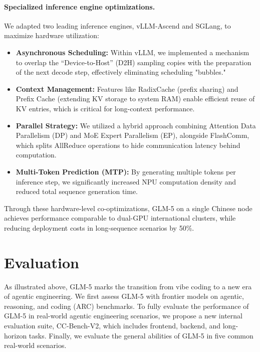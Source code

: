 \documentclass{article}
\theoremstyle{definition}
\begin{document}
\paragraph{Specialized inference engine optimizations.}
We adapted two leading inference engines, vLLM-Ascend and SGLang, to maximize hardware utilization:

\begin{itemize}[leftmargin=1.5em,itemsep=2pt]
    \item \textbf{Asynchronous Scheduling:} Within vLLM, we implemented a mechanism to overlap the ``Device-to-Host'' (D2H) sampling copies with the preparation of the next decode step, effectively eliminating scheduling "bubbles."
    
    \item \textbf{Context Management:} Features like RadixCache (prefix sharing) and Prefix Cache (extending KV storage to system RAM) enable efficient reuse of KV entries, which is critical for long-context performance.

    \item \textbf{Parallel Strategy:} We utilized a hybrid approach combining Attention Data Parallelism (DP) and MoE Expert Parallelism (EP), alongside FlashComm, which splits AllReduce operations to hide communication latency behind computation.

    \item \textbf{Multi-Token Prediction (MTP):} By generating multiple tokens per inference step, we significantly increased NPU computation density and reduced total sequence generation time.
\end{itemize}

Through these hardware-level co-optimizations, GLM-5 on a single Chinese node achieves performance comparable to dual-GPU international clusters, while reducing deployment costs in long-sequence scenarios by 50\%.

\section{Evaluation}
\label{sec:evaluation}

As illustrated above, GLM-5 marks the transition from vibe coding to a new era of agentic engineering. 
We first assess GLM-5 with frontier models on agentic, reasoning, and coding (ARC) benchmarks. 
To fully evaluate the performance of GLM-5 in real-world agentic engineering scenarios, we propose a new internal evaluation suite, CC-Bench-V2, which includes frontend, backend, and long-horizon tasks. 
Finally, we evaluate the general abilities of GLM-5 in five common real-world scenarios. 
\end{document}
